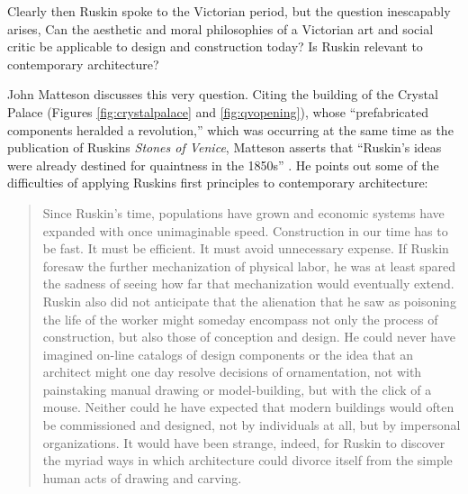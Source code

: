 
Clearly then Ruskin spoke to the Victorian period, but the question
inescapably arises, Can the aesthetic and moral philosophies of a
Victorian art and social critic be applicable to design and
construction today?  Is Ruskin relevant to contemporary architecture? 


John Matteson discusses this very question.  Citing the building of the
Crystal Palace (Figures \ref{fig:crystalpalace} and \ref{fig:qvopening}), 
whose ``prefabricated components heralded a
revolution,'' which was occurring at the same time as the publication of
Ruskin{\textquotesingle}s \textit{Stones of Venice}, Matteson asserts
that ``Ruskin’s ideas were already destined for quaintness in the
1850s'' \citep[][pg. 300]{matteson2002}.  He points out some of the difficulties of
applying Ruskin{\textquotesingle}s first principles to contemporary
architecture: 


\begin{quote}
Since Ruskin’s time, populations have grown and economic systems have
expanded with once unimaginable speed.  Construction in our time has to
be fast.  It must be efficient.  It must avoid unnecessary expense.  If
Ruskin foresaw the further mechanization of physical labor, he was at
least spared the sadness of seeing how far that mechanization would
eventually extend.  Ruskin also did not anticipate that the alienation
that he saw as poisoning the life of the worker might someday encompass
not only the process of construction, but also those of conception and
design.  He could never have imagined on-line catalogs of design
components or the idea that an architect might one day resolve
decisions of ornamentation, not with painstaking manual drawing or
model-building, but with the click of a mouse.  Neither could he have
expected that modern buildings would often be commissioned and
designed, not by individuals at all, but by impersonal organizations. 
It would have been strange, indeed, for Ruskin to discover the myriad
ways in which architecture could divorce itself from the simple human
acts of drawing and carving. \citep[][pg. 300]{matteson2002}
\end{quote}

